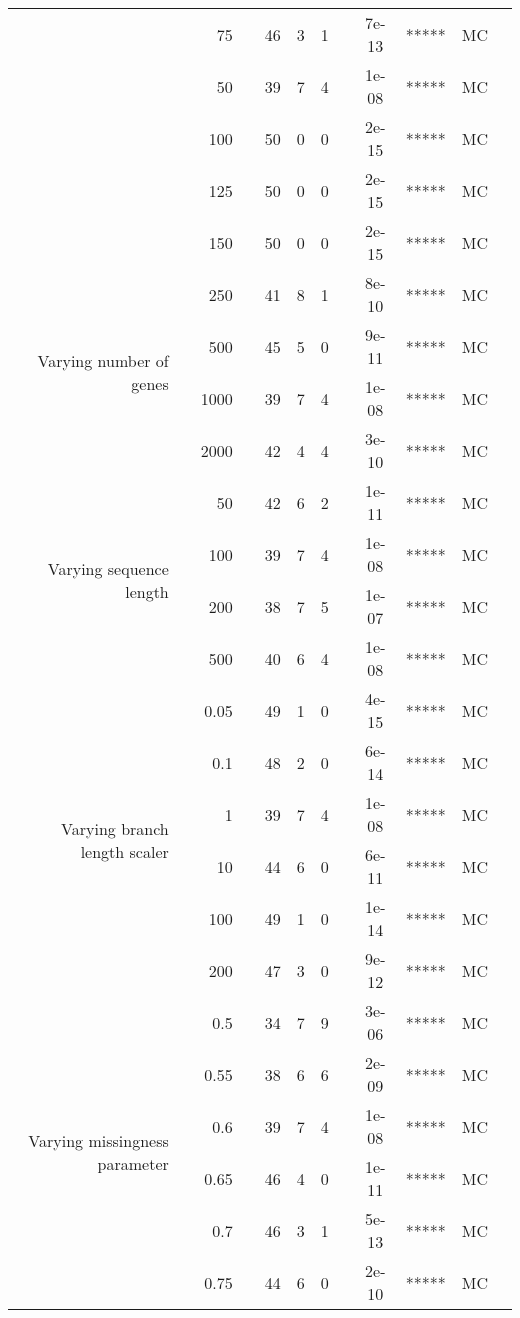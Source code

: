 \begin{table}[!h]
\begin{tabular}{r r r l r r r l c c c l}
   & & 75 & & 46 & 3 & 1 & & 7e-13 & ***** & MC &  \\
   & & 50 & & 39 & 7 & 4 & & 1e-08 & ***** & MC &  \\
   & & 100 & & 50 & 0 & 0 & & 2e-15 & ***** & MC &  \\
   & & 125 & & 50 & 0 & 0 & & 2e-15 & ***** & MC &  \\
   & & 150 & & 50 & 0 & 0 & & 2e-15 & ***** & MC &  \\
\midrule
\multirow{ 4}{2cm}{Varying number of genes}
   & & 250 & & 41 & 8 & 1 & & 8e-10 & ***** & MC &  \\
   & & 500 & & 45 & 5 & 0 & & 9e-11 & ***** & MC &  \\
   & & 1000 & & 39 & 7 & 4 & & 1e-08 & ***** & MC &  \\
   & & 2000 & & 42 & 4 & 4 & & 3e-10 & ***** & MC &  \\
\midrule
\multirow{ 4}{2cm}{Varying sequence length}
   & & 50 & & 42 & 6 & 2 & & 1e-11 & ***** & MC &  \\
   & & 100 & & 39 & 7 & 4 & & 1e-08 & ***** & MC &  \\
   & & 200 & & 38 & 7 & 5 & & 1e-07 & ***** & MC &  \\
   & & 500 & & 40 & 6 & 4 & & 1e-08 & ***** & MC &  \\
\midrule
\multirow{ 6}{2cm}{Varying branch length scaler}
   & & 0.05 & & 49 & 1 & 0 & & 4e-15 & ***** & MC &  \\
   & & 0.1 & & 48 & 2 & 0 & & 6e-14 & ***** & MC &  \\
   & & 1 & & 39 & 7 & 4 & & 1e-08 & ***** & MC &  \\
   & & 10 & & 44 & 6 & 0 & & 6e-11 & ***** & MC &  \\
   & & 100 & & 49 & 1 & 0 & & 1e-14 & ***** & MC &  \\
   & & 200 & & 47 & 3 & 0 & & 9e-12 & ***** & MC &  \\
\midrule
\multirow{ 6}{2cm}{Varying missingness parameter}
   & & 0.5 & & 34 & 7 & 9 & & 3e-06 & ***** & MC &  \\
   & & 0.55 & & 38 & 6 & 6 & & 2e-09 & ***** & MC &  \\
   & & 0.6 & & 39 & 7 & 4 & & 1e-08 & ***** & MC &  \\
   & & 0.65 & & 46 & 4 & 0 & & 1e-11 & ***** & MC &  \\
   & & 0.7 & & 46 & 3 & 1 & & 5e-13 & ***** & MC &  \\
   & & 0.75 & & 44 & 6 & 0 & & 2e-10 & ***** & MC &  \\
\bottomrule
\end{tabular}
\end{table}



